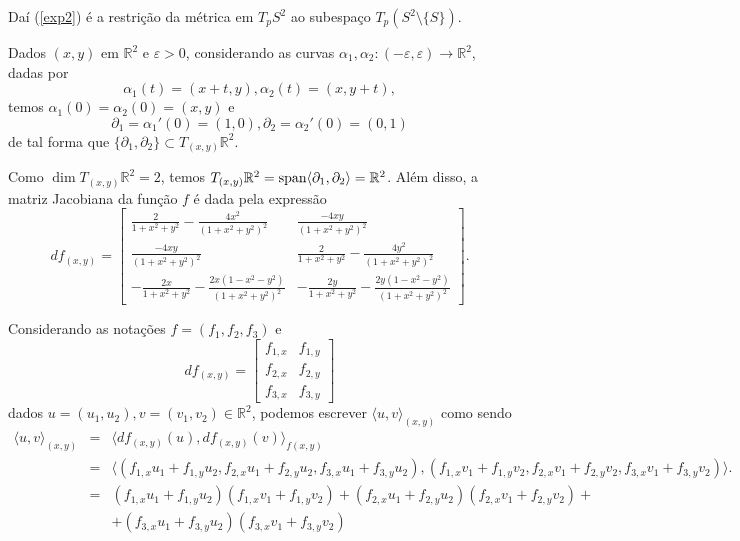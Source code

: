 \documentclass[twoside,openright,titlepage,numbers=noenddot,headinclude,  lineheaders footinclude=true,cleardoublepage=empty,BCOR=5mm,paper=a4,fontsize=12pt ]{scrbook}
\newcommand{\R}{\mathbb R}
\begin{document}
Daí (\ref{exp2}) é a restrição da métrica em $T_p S^2$ ao subespaço $T_p (S^2 \setminus \{S\})$.  

Dados $(x,y)$ em $\R^2$ e $\varepsilon>0$, considerando as curvas $\alpha_1,\alpha_2: (-\varepsilon,\varepsilon) \longrightarrow \R^2$, dadas por 
\begin{equation*}
    \alpha_1(t) = (x+t,y), \alpha_2(t) = (x,y+t), 
\end{equation*}
temos $\alpha_1(0) = \alpha_2(0) = (x,y)$ e 
\begin{equation*}
    \partial_1 = \alpha_1'(0) = (1,0), \partial_2 = \alpha_2'(0) = (0,1)
\end{equation*}
de tal forma que $\{\partial_1,\partial_2\} \subset T_{(x,y)} \R^2$. 

Como $\dim T_{(x,y)} \R^2 = 2$, temos $T_{(x,y)} \R^2 = \hbox{span}\langle \partial_1,\partial_2\rangle = \R^2$. Além disso, a matriz Jacobiana da função $f$ é dada pela expressão
\begin{equation*}
    df_{(x,y)} = 
    \begin{bmatrix}
        \frac{2}{1+x^2+y^2} - \frac{4x^2}{(1+x^2+y^2)^2} & \frac{-4xy}{(1+x^2+y^2)^2}\\
        \frac{-4xy}{(1+x^2+y^2)^2} & \frac{2}{1+x^2+y^2} - \frac{4y^2}{(1+x^2+y^2)^2}\\
        -\frac{2x}{1+x^2+y^2} - \frac{2x(1-x^2-y^2)}{(1+x^2+y^2)^2} & -\frac{2y}{1+x^2+y^2} - \frac{2y(1-x^2-y^2)}{(1+x^2+y^2)^2}
    \end{bmatrix}. 
\end{equation*}

Considerando as notações $f = (f_1,f_2,f_3)$ e 
\begin{equation*}
    df_{(x,y)} = 
    \begin{bmatrix}
    f_{1,x} & f_{1,y}\\
    f_{2,x} & f_{2,y}\\
    f_{3,x} & f_{3,y}
    \end{bmatrix}
\end{equation*}
dados $u = (u_1,u_2), v=(v_1,v_2) \in \R^2$, podemos escrever $\langle u,v\rangle_{(x,y)}$ como sendo \begin{eqnarray*}
    \langle u,v\rangle_{(x,y)} &=& \langle df_{(x,y)}(u),df_{(x,y)}(v)\rangle_{f(x,y)}\\
    &=&\scriptstyle{\langle (f_{1,x}u_1 + f_{1,y}u_2,f_{2,x}u_1 + f_{2,y}u_2,f_{3,x}u_1 + f_{3,y}u_2),(f_{1,x}v_1 + f_{1,y}v_2,f_{2,x}v_1 + f_{2,y}v_2,f_{3,x}v_1 + f_{3,y}v_2)\rangle.}\\
    &=&(f_{1,x}u_1 + f_{1,y}u_2)(f_{1,x}v_1 + f_{1,y}v_2) +(f_{2,x}u_1 + f_{2,y}u_2)(f_{2,x}v_1 + f_{2,y}v_2)+ \\
    & &+(f_{3,x}u_1 + f_{3,y}u_2)(f_{3,x}v_1 + f_{3,y}v_2) 
\end{eqnarray*}
\end{document}
